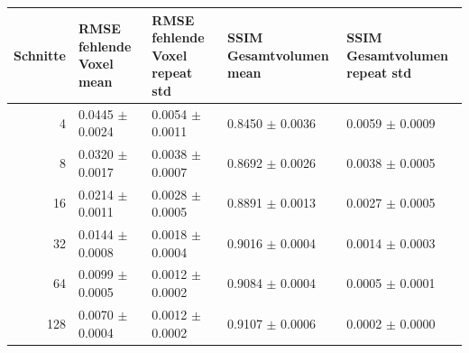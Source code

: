 \begin{tabular}{rllll}
\toprule
Schnitte & RMSE fehlende Voxel mean & RMSE fehlende Voxel repeat std & SSIM Gesamtvolumen mean & SSIM Gesamtvolumen repeat std \\
\midrule
4 & 0.0445 $\pm$ 0.0024 & 0.0054 $\pm$ 0.0011 & 0.8450 $\pm$ 0.0036 & 0.0059 $\pm$ 0.0009 \\
8 & 0.0320 $\pm$ 0.0017 & 0.0038 $\pm$ 0.0007 & 0.8692 $\pm$ 0.0026 & 0.0038 $\pm$ 0.0005 \\
16 & 0.0214 $\pm$ 0.0011 & 0.0028 $\pm$ 0.0005 & 0.8891 $\pm$ 0.0013 & 0.0027 $\pm$ 0.0005 \\
32 & 0.0144 $\pm$ 0.0008 & 0.0018 $\pm$ 0.0004 & 0.9016 $\pm$ 0.0004 & 0.0014 $\pm$ 0.0003 \\
64 & 0.0099 $\pm$ 0.0005 & 0.0012 $\pm$ 0.0002 & 0.9084 $\pm$ 0.0004 & 0.0005 $\pm$ 0.0001 \\
128 & 0.0070 $\pm$ 0.0004 & 0.0012 $\pm$ 0.0002 & 0.9107 $\pm$ 0.0006 & 0.0002 $\pm$ 0.0000 \\
\bottomrule
\end{tabular}
